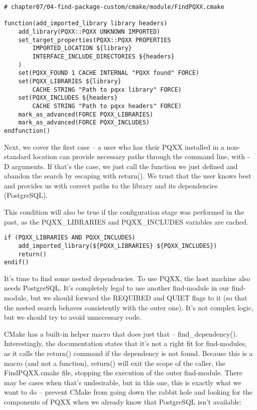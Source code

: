 \begin{lstlisting}[style=styleCMake]
# chapter07/04-find-package-custom/cmake/module/FindPQXX.cmake

function(add_imported_library library headers)
	add_library(PQXX::PQXX UNKNOWN IMPORTED)
	set_target_properties(PQXX::PQXX PROPERTIES
		IMPORTED_LOCATION ${library}
		INTERFACE_INCLUDE_DIRECTORIES ${headers}
	)
	set(PQXX_FOUND 1 CACHE INTERNAL "PQXX found" FORCE)
	set(PQXX_LIBRARIES ${library}
		CACHE STRING "Path to pqxx library" FORCE)
	set(PQXX_INCLUDES ${headers}
		CACHE STRING "Path to pqxx headers" FORCE)
	mark_as_advanced(FORCE PQXX_LIBRARIES)
	mark_as_advanced(FORCE PQXX_INCLUDES)
endfunction()
\end{lstlisting}

Next, we cover the first case – a user who has their PQXX installed in a non-standard location can provide necessary paths through the command line, with -D arguments. If that's the case, we just call the function we just defined and abandon the search by escaping with return(). We trust that the user knows best and provides us with correct paths to the library and its dependencies (PostgreSQL).

This condition will also be true if the configuration stage was performed in the past, as the PQXX\_LIBRARIES and PQXX\_INCLUDES variables are cached.

\begin{lstlisting}[style=styleCMake]
if (PQXX_LIBRARIES AND PQXX_INCLUDES)
	add_imported_library(${PQXX_LIBRARIES} ${PQXX_INCLUDES})
	return()
endif()
\end{lstlisting}

It's time to find some nested dependencies. To use PQXX, the host machine also needs PostgreSQL. It's completely legal to use another find-module in our find-module, but we should forward the REQUIRED and QUIET flags to it (so that the nested search behaves consistently with the outer one). It's not complex logic, but we should try to avoid unnecessary code.

CMake has a built-in helper macro that does just that – find\_dependency(). Interestingly, the documentation states that it's not a right fit for find-modules, as it calls the return() command if the dependency is not found. Because this is a macro (and not a function), return() will exit the scope of the caller, the FindPQXX.cmake file, stopping the execution of the outer find-module. There may be cases when that's undesirable, but in this one, this is exactly what we want to do – prevent CMake from going down the rabbit hole and looking for the components of PQXX when we already know that PostgreSQL isn't available:

